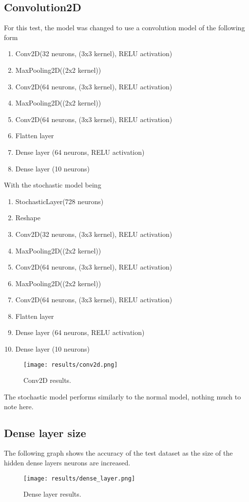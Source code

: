 \documentclass[a4paper,oneside,phd,etd]{BYUPhys}
\begin{document}
\subsection{Convolution2D}
For this test, the model was changed to use a convolution model of the following form
\begin{enumerate}
    \itemsep0em
    \item Conv2D(32 neurons, (3x3 kernel), RELU activation)
    \item MaxPooling2D((2x2 kernel))
    \item Conv2D(64 neurons, (3x3 kernel), RELU activation)
    \item MaxPooling2D((2x2 kernel))
    \item Conv2D(64 neurons, (3x3 kernel), RELU activation)
    \item Flatten layer
    \item Dense layer (64 neurons, RELU activation)
    \item Dense layer (10 neurons)
\end{enumerate}
With the stochastic model being
\begin{enumerate}
    \itemsep0em
    \item StochasticLayer(728 neurons)
    \item Reshape
    \item Conv2D(32 neurons, (3x3 kernel), RELU activation)
    \item MaxPooling2D((2x2 kernel))
    \item Conv2D(64 neurons, (3x3 kernel), RELU activation)
    \item MaxPooling2D((2x2 kernel))
    \item Conv2D(64 neurons, (3x3 kernel), RELU activation)
    \item Flatten layer
    \item Dense layer (64 neurons, RELU activation)
    \item Dense layer (10 neurons)
\end{enumerate}

\begin{figure}[H]
\centering
\texttt{[image: results/conv2d.png]}
\caption{Conv2D results.}
\label{fig:conv2d}
\end{figure}
The stochastic model performs similarly to the normal model, nothing much to note here.

\subsection{Dense layer size}
The following graph shows the accuracy of the test dataset as the size of the hidden dense layers neurons are increased.
\begin{figure}[H]
\centering
\texttt{[image: results/dense\_layer.png]}
\caption{Dense layer results.}
\label{fig:denselayer}
\end{figure}
\end{document}
